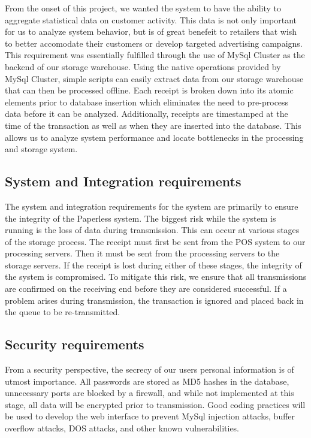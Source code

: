 From the onset of this project, we wanted the system to have the ability to aggregate statistical data on customer activity.  This data is not only important for us to analyze system behavior, but is of great benefeit to retailers that wish to better accomodate their customers or develop targeted advertising campaigns.  This requirement was essentially fulfilled through the use of MySql Cluster as the backend of our storage warehouse.  Using the native operations provided by MySql Cluster, simple scripts can easily extract data from our storage warehouse that can then be processed offline.  Each receipt is broken down into its atomic elements prior to database insertion which eliminates the need to pre-process data before it can be analyzed.  Additionally, receipts are timestamped at the time of the transaction as well as when they are inserted into the database.  This allows us to analyze system performance and locate bottlenecks in the processing and storage system.

\subsection{System and Integration requirements}
\label{sec:requirements.system}

The system and integration requirements for the system are primarily to ensure the integrity of the Paperless system.  The biggest risk while the system is running is the loss of data during transmission.  This can occur at various stages of the storage process.  The receipt must first be sent from the POS system to our processing servers.  Then it must be sent from the processing servers to the storage servers.  If the receipt is lost during either of these stages, the integrity of the system is compromised.  To mitigate this risk, we ensure that all transmissions are confirmed on the receiving end before they are considered successful.  If a problem arises during transmission, the transaction is ignored and placed back in the queue to be re-transmitted.

\subsection{Security requirements}
\label{sec:requirements.security}

From a security perspective, the secrecy of our users personal information is of utmost importance.  All passwords are stored as MD5 hashes in the database, unnecessary ports are blocked by a firewall, and while not implemented at this stage, all data will be encrypted prior to transmission.  Good coding practices will be used to develop the web interface to prevent MySql injection attacks, buffer overflow attacks, DOS attacks, and other known vulnerabilities.

